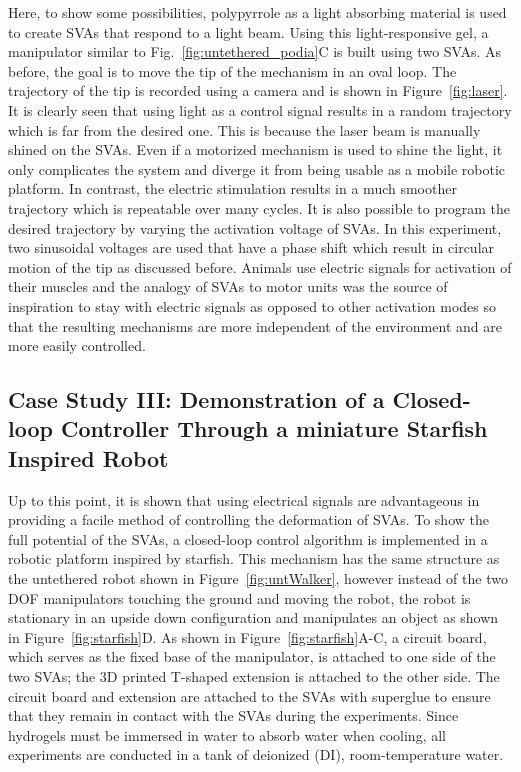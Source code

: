 Here, to show some possibilities, polypyrrole as a light absorbing material is used to create SVAs that respond to a light beam. Using this light-responsive gel, a manipulator similar to Fig.~\ref{fig:untethered_podia}C  is built using two SVAs. As before, the goal is to move the tip of the mechanism in an oval loop. The trajectory of the tip is recorded using a camera and is shown in Figure~\ref{fig:laser}. It is clearly seen that using light as a control signal results in a random trajectory which is far from the desired one. This is because the laser beam is manually shined on the SVAs. Even if a motorized mechanism is used to shine the light, it only complicates the system and diverge it from being usable as a mobile robotic platform.  In contrast, the electric stimulation results in a much smoother trajectory which is repeatable over many cycles. It is also possible to program the desired trajectory by varying the activation voltage of SVAs. In this experiment, two sinusoidal voltages are used that have a phase shift which result in circular motion of the tip as discussed before. Animals use electric signals for activation of their muscles and the analogy of SVAs to motor units was the source of inspiration to stay with electric signals as opposed to other activation modes so that the resulting mechanisms are more independent of the environment and are more easily controlled. 

\subsection{Case Study III: Demonstration of a Closed-loop Controller Through a miniature Starfish Inspired Robot}
Up to this point, it is shown that using electrical signals are advantageous in providing a facile method of controlling the deformation of SVAs. To show the full potential of the SVAs, a closed-loop control algorithm is implemented in a robotic platform inspired by starfish. This mechanism has the same structure as the untethered robot shown in Figure~\ref{fig:untWalker}, however instead of the two DOF manipulators touching the ground and moving the robot, the robot is stationary in an upside down configuration and manipulates an object as shown in Figure~\ref{fig:starfish}D. As shown in Figure~\ref{fig:starfish}A-C, a circuit board, which serves as the fixed base of the manipulator, is attached to one side of the two SVAs; the 3D printed T-shaped extension is attached to the other side. The circuit board and extension are attached to the SVAs with superglue to ensure that they remain in contact with the SVAs during the experiments. Since hydrogels must be immersed in water to absorb water when cooling, all experiments are conducted in a tank of deionized (DI), room-temperature water.

